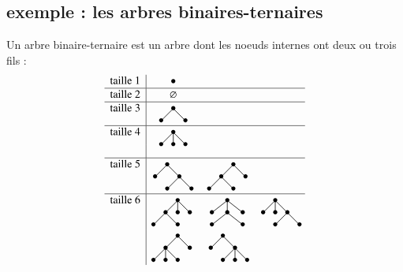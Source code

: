 \documentclass[12pt]{article}
\begin{document}
\subsection*{exemple : les arbres binaires-ternaires}
Un arbre binaire-ternaire est un arbre dont les noeuds internes ont deux ou trois fils : 
$$
\begin{array}{c|ccc}
  \text{taille 1} & \bullet&&\\
  \hline
  \text{taille 2} & \varnothing&&\\
  \hline
  \text{taille 3} & \xymatrix@R=5pt @C=5pt{& *={\bullet}  \ar@{-}[dl] \ar@{-}[dr] & \\ *={\bullet} & &*={\bullet}}&&\\
  \hline
  \text{taille 4} & \xymatrix@R=8pt @C=8pt{&  *={\bullet} \ar@{-}[dr] \ar@{-}[d] \ar@{-}[dl]&\\ *={\bullet}& *={\bullet} & *={\bullet}} &  &\\
&&&\\
 \hline 
 \text{taille 5} & \xymatrix@R=5pt @C=5pt{& *={\bullet} \ar@{-}[dr] \ar@{-}[dl]& &\\ *={\bullet} & & *={\bullet} \ar@{-}[dr] \ar@{-}[dl]& \\  & *={\bullet} & & *={\bullet}} 
 &\xymatrix@R=5pt @C=5pt{&& *={\bullet} \ar@{-}[dr] \ar@{-}[dl]&\\&*={\bullet}\ar@{-}[dr] \ar@{-}[dl]& & *={\bullet}  \\ *={\bullet} & & *={\bullet} &} & \\
 \hline
 \text{taille 6} & \xymatrix@R=8pt @C=8pt{ *={}&& *={\bullet} \ar@{-}[dl] \ar@{-}[d] \ar@{-}[dr]& \\*={} & *={\bullet} \ar@{-}[dl] \ar@{-}[dr] & *={\bullet} & *={\bullet}\\ *={\bullet} & *={}& *={\bullet} & }
 &\xymatrix@R=8pt @C=8pt{& *={\bullet} \ar@{-}[dl] \ar@{-}[d] \ar@{-}[dr]&\\ *={\bullet}  & *={\bullet}\ar@{-}[dl] \ar@{-}[dr] & *={\bullet}\\ *={\bullet} && *={\bullet} }
 & \xymatrix@R=8pt @C=8pt{ & *={\bullet} \ar@{-}[dl] \ar@{-}[d] \ar@{-}[dr]& &*={}\\ *={\bullet}  & *={\bullet} & *={\bullet}\ar@{-}[dl] \ar@{-}[dr]&*={} \\  &*={\bullet} & *={}& *={\bullet} }\\
 & \xymatrix@R=8pt @C=8pt{*={}& & *={\bullet}  \ar@{-}[dl] \ar@{-}[dr] & \\ *={}&*={\bullet}\ar@{-}[dl]\ar@{-}[d]\ar@{-}[dr] &*={} &*={\bullet}\\ *={\bullet}&*={\bullet}&*={\bullet} &}
 &\xymatrix@R=8pt @C=8pt{& *={\bullet}  \ar@{-}[dl] \ar@{-}[dr] & &*={}\\ *={\bullet} &*={} &*={\bullet}\ar@{-}[dl]\ar@{-}[d]\ar@{-}[dr] &*={}\\& *={\bullet}&*={\bullet}&*={\bullet} }&\\
\end{array}
$$
\end{document}
